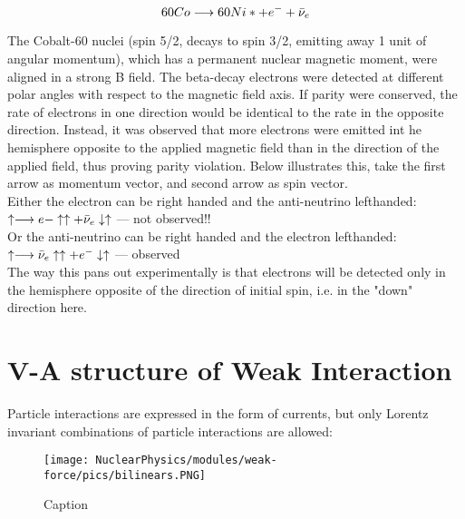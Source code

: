         \begin{equation}
            60Co \longrightarrow 60Ni* + e^- + \Bar{\nu}_e
        \end{equation}
        
        The Cobalt-60 nuclei (spin 5/2, decays to spin 3/2, emitting away 1 unit of angular momentum), which has a permanent nuclear magnetic moment, were aligned in a strong B field. The beta-decay electrons were detected at different polar angles with respect to the magnetic field axis. If parity were conserved, the rate of electrons in one direction would be identical to the rate in the opposite direction. Instead, it was observed that more electrons were emitted int he hemisphere opposite to the applied magnetic field than in the direction of the applied field, thus proving parity violation. Below illustrates this, take the first arrow as momentum vector, and second arrow as spin vector.\\
        \newline
        Either the electron can be right handed and the anti-neutrino lefthanded:\\
       $\uparrow \longrightarrow e- \uparrow \uparrow + \Bar{\nu}_e \downarrow \uparrow$ --- not observed!!\\
       \newline
       Or the anti-neutrino can be right handed and the electron lefthanded:\\
       $\uparrow \longrightarrow \Bar{\nu}_e  \uparrow \uparrow + e^- \downarrow \uparrow$ --- observed \\
       \newline
       The way this pans out experimentally is that electrons will be detected only in the hemisphere opposite of the direction of initial spin, i.e. in the "down" direction here. 
        
        
    \section{V-A structure of Weak Interaction}
        \indent Particle interactions are expressed in the form of currents, but only Lorentz invariant combinations of particle interactions are allowed:
        
            \begin{figure}[H]
                \centering
                \texttt{[image: NuclearPhysics/modules/weak-force/pics/bilinears.PNG]}
            \caption{Caption}
            \end{figure}
            
